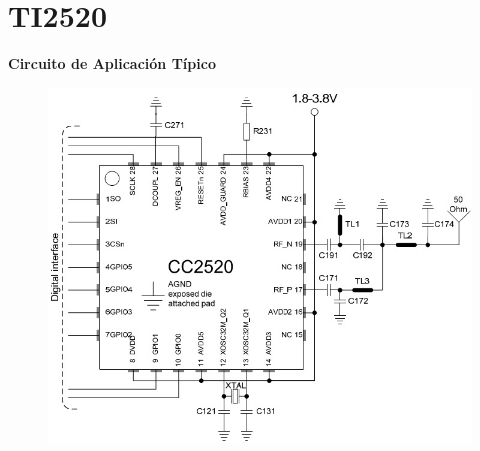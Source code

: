 \documentclass[aspectratio=169]{beamer}
\begin{document}
\section{TI2520}
\begin{frame}{\textbf{Circuito de Aplicación Típico}}
\begin{minipage}[c]{1.0\linewidth}
\begin{figure}[H]
	\includegraphics[width=1\textwidth]{./imagenes/applicationcircuit.jpg}
		\end{figure}	
\end{minipage}
\end{frame}
\end{document}
